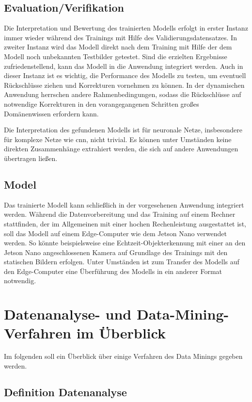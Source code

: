 \subsection{Evaluation/Verifikation}

Die Interpretation und Bewertung des trainierten Modells erfolgt in erster Instanz immer wieder während des Trainings mit Hilfe des Validierungsdatensatzes. In zweiter Instanz wird das Modell direkt nach dem Training mit Hilfe der dem Modell noch unbekannten Testbilder getestet. Sind die erzielten Ergebnisse zufriedenstellend, kann das Modell in die Anwendung integriert werden. Auch in dieser Instanz ist es wichtig, die Performance des Modells zu testen, um eventuell Rückschlüsse ziehen und Korrekturen vornehmen zu können. In der dynamischen Anwendung herrschen andere Rahmenbedingungen, sodass die Rückschlüsse auf notwendige Korrekturen in den vorangegangenen Schritten großes Domänenwissen erfordern kann.

Die Interpretation des gefundenen Modells ist für neuronale Netze, insbesondere für komplexe Netze wie \ac{cnn}, nicht trivial. Es können unter Umständen keine direkten Zusammenhänge extrahiert werden, die sich auf andere Anwendungen übertragen ließen.

\subsection{Model}

Das trainierte Modell kann schließlich in der vorgesehenen Anwendung integriert werden. Während die Datenvorbereitung und das Training auf einem Rechner stattfinden, der im Allgemeinen mit einer hochen Rechenleistung ausgestattet ist, soll das Modell auf einem Edge-Computer wie dem Jetson Nano verwendet werden. So könnte beispielsweise eine Echtzeit-Objekterkennung mit einer an den Jetson Nano angeschlossenen Kamera auf Grundlage des Trainings mit den statischen Bildern erfolgen. Unter Umständen ist zum Transfer des Modells auf den Edge-Computer eine Überführung des Modells in ein anderer Format notwendig.


\section{Datenanalyse- und Data-Mining-Verfahren im Überblick}

Im folgenden soll ein Überblick über einige Verfahren des Data Minings gegeben werden.

\subsection{Definition Datenanalyse}


